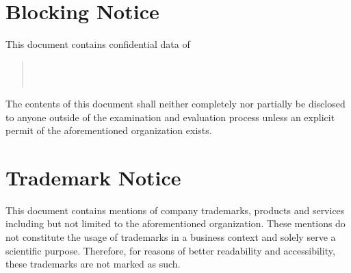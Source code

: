 \section*{Blocking Notice}
This document contains confidential data of

\begin{quote}
	\firmaName \\
	\firmaStrasse \\
	\firmaPlz
\end{quote}

\vspace{0.5cm}

The contents of this document shall neither completely nor partially be disclosed to anyone outside of the examination and evaluation process unless an explicit permit of the aforementioned organization exists.


\vspace*{\fill}

\section*{Trademark Notice}

This document contains mentions of company trademarks, products and services including but not limited to the aforementioned organization. These mentions do not constitute the usage of trademarks in a business context and solely serve a scientific purpose. Therefore, for reasons of better readability and accessibility, these trademarks are not marked as such.